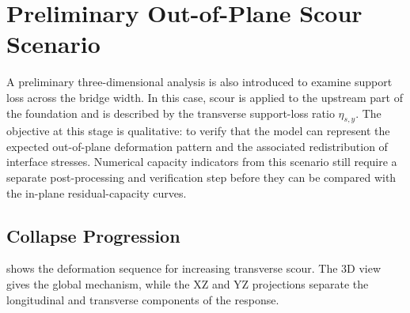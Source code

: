 \section{Preliminary Out-of-Plane Scour Scenario}
\label{sec:dmem-scour-out-of-plane}

A preliminary three-dimensional analysis is also introduced to examine support loss across the bridge width. In this case, scour is applied to the upstream part of the foundation and is described by the transverse support-loss ratio $\eta_{s,y}$. The objective at this stage is qualitative: to verify that the model can represent the expected out-of-plane deformation pattern and the associated redistribution of interface stresses. Numerical capacity indicators from this scenario still require a separate post-processing and verification step before they can be compared with the in-plane residual-capacity curves.

\subsection{Collapse Progression}
\label{sec:dmem-scour-out-of-plane-collapse}

 shows the deformation sequence for increasing transverse scour. The 3D view gives the global mechanism, while the XZ and YZ projections separate the longitudinal and transverse components of the response.

